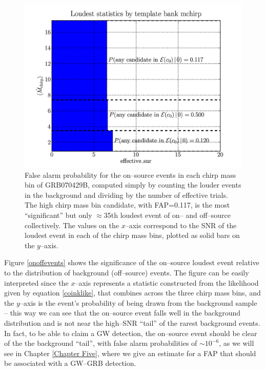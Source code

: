 \begin{figure}[ht!]
\centering
\includegraphics[scale=0.35]{Images/FAR.png}
\caption{False alarm probability for the on--source events in each chirp mass bin of GRB070429B, computed simply by counting the louder events in the background and dividing by the number of effective trials. The high chirp mass bin candidate, with FAP=0.117, is the most ``significant'' but only $\approx$35th loudest event of on-- and off--source collectively. The values on the $x$--axis correspond to the SNR of the loudest event in each of the chirp mass bins, plotted as solid bars on the $y$--axis.}
\label{fig:far}
\end{figure}

Figure \ref{onoffevents} shows the significance of the on--source loudest event relative to the distribution of background (off--source) events. The figure can be easily interpreted since the $x$--axis represents a statistic constructed from the likelihood given by equation \ref{coinklike}, that combines across the three chirp mass bins, and the $y$--axis is the event's probability of being drawn from the background sample -- this way we can see that the on--source event falls well in the background distribution and is not near the high--SNR ``tail'' of the rarest background events. In fact, to be able to claim a GW detection, the on--source event should be clear of the the background ``tail'', with false alarm probabilities of $\sim 10^{-6}$, as we will see in Chapter \ref{Chapter Five}, where we give an estimate for a FAP that should be associated with a GW--GRB detection.

